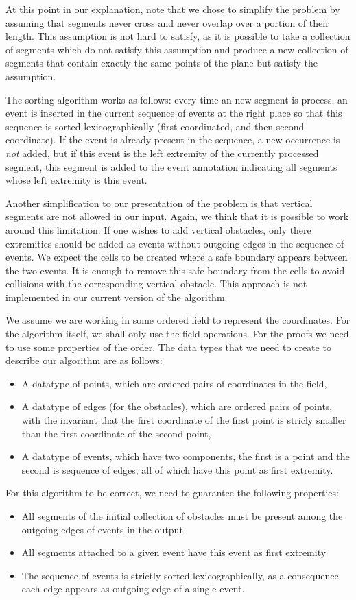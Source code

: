 \documentclass{easychair}
\begin{document}
At this point in our explanation, note that we chose to
simplify the problem by assuming that segments never cross and never
overlap over a portion of their length.  This assumption is not hard
to satisfy, as it is possible to take a collection of segments which
do not satisfy this assumption and produce a new collection of
segments that contain exactly the same points of the plane but satisfy
the assumption.

The sorting algorithm works as follows: every time an new segment is
process, an event is inserted in the current sequence of events at the
right place so that this sequence is sorted lexicographically (first
coordinated, and then second coordinate).  If the event is already
present in the sequence, a new occurrence is {\em not} added, but if
this event is the left extremity of the currently processed
segment, this segment is added to the event annotation indicating all
segments whose left extremity is this event.

Another simplification to our presentation of the problem is that
vertical segments are not allowed in our input.  Again, we think that
it is possible to work around this limitation: If one wishes to add
vertical obstacles, only there extremities should be added as events
without outgoing edges in the sequence of events.  We expect the
cells to be created where a safe boundary appears between the two
events.  It is enough to remove this safe boundary from the cells to
avoid collisions with the corresponding vertical obstacle.  This
approach is not implemented in our current version of the algorithm.

We assume we are working in some ordered field to represent the
coordinates.  For the algorithm itself, we shall only use the field
operations.  For the proofs we need to use some properties of the order.
The data types that we need to create to describe our algorithm are as
follows:
\begin{itemize}
\item A datatype of points, which are ordered pairs of coordinates in the field,
\item A datatype of edges (for the obstacles), which are ordered pairs of
  points, with the invariant that the first coordinate of the first
  point is stricly smaller than the first coordinate of the second point,
\item A datatype of events, which have two components, the first is a
  point and the second is sequence of edges, all of which have this
  point as first extremity.
\end{itemize}
For this algorithm to be correct, we need to guarantee the following
properties:
\begin{itemize}
\item All segments of the initial collection of obstacles must be
  present among the outgoing edges of events in the output
\item All segments attached to a given event have this event as first
  extremity
\item The sequence of events is strictly sorted lexicographically, as
  a consequence each edge appears as outgoing edge of a single event.
\end{itemize}
\end{document}
